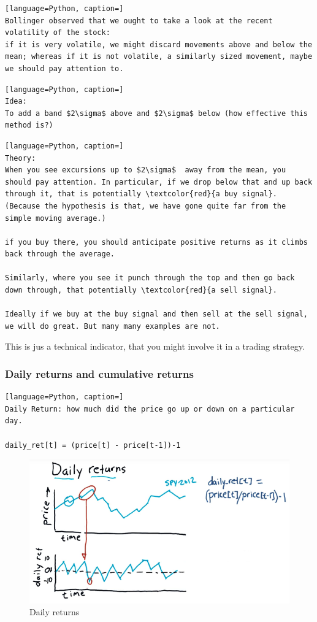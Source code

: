 \documentclass[12pt]{article}
\begin{document}
\begin{lstlisting}[language=Python, caption=]
Bollinger observed that we ought to take a look at the recent volatility of the stock:
if it is very volatile, we might discard movements above and below the mean; whereas if it is not volatile, a similarly sized movement, maybe we should pay attention to.
\end{lstlisting}

\begin{lstlisting}[language=Python, caption=]
Idea: 
To add a band $2\sigma$ above and $2\sigma$ below (how effective this method is?)
\end{lstlisting}

\begin{lstlisting}[language=Python, caption=]
Theory:
When you see excursions up to $2\sigma$  away from the mean, you should pay attention. In particular, if we drop below that and up back through it, that is potentially \textcolor{red}{a buy signal}. (Because the hypothesis is that, we have gone quite far from the simple moving average.)

if you buy there, you should anticipate positive returns as it climbs back through the average.

Similarly, where you see it punch through the top and then go back down through, that potentially \textcolor{red}{a sell signal}.

Ideally if we buy at the buy signal and then sell at the sell signal, we will do great. But many many examples are not.
\end{lstlisting}

\noindent
This is jus a technical indicator, that you might involve it in a trading strategy.

\subsubsection{Daily returns and cumulative returns}

\begin{lstlisting}[language=Python, caption=]
Daily Return: how much did the price go up or down on a particular day.

daily_ret[t] = (price[t] - price[t-1])-1
\end{lstlisting}

\begin{figure}[!ht]
\centering
\includegraphics[scale=0.45]{fig/fig12}
\caption{Daily returns}
\end{figure}
\end{document}
